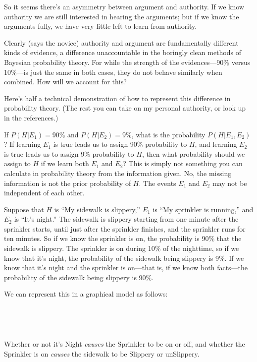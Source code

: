 {
 So it seems there's an asymmetry between argument
and authority. If we know authority we are still interested in hearing
the arguments; but if we know the arguments fully, we have very little
left to learn from authority.}

{
 Clearly (says the novice) authority and argument are fundamentally
different kinds of evidence, a difference unaccountable in the boringly
clean methods of Bayesian probability theory. For while the strength of
the evidences---90\% versus 10\%---is just the same in both cases, they
do not behave similarly when combined. How will we account for this?}

{
 Here's half a technical demonstration of how to
represent this difference in probability theory. (The rest you can take
on my personal authority, or look up in the references.)}

{
 If $P(H|E_{1}) = 90\%$ and
$P(H|E_{2}) = 9\%$, what is the probability
$P(H|E_{1},E_{2})$? If learning
$E_{1}$ is true leads us to assign 90\% probability to $H$,
and learning $E_{2}$ is true leads us to assign 9\%
probability to $H$, then what probability should we assign to $H$ if we
learn both $E_{1}$ and $E_{2}$? This is simply
not something you can calculate in probability theory from the
information given. No, the missing information is not the prior
probability of $H$. The events $E_{1}$ and $E_{2}$
may not be independent of each other.}

{
 Suppose that $H$ is ``My sidewalk is
slippery,'' $E_{1}$ is
``My sprinkler is running,'' and
$E_{2}$ is ``It's
night.'' The sidewalk is slippery starting from one
minute after the sprinkler starts, until just after the sprinkler
finishes, and the sprinkler runs for ten minutes. So if we know the
sprinkler is on, the probability is 90\% that the sidewalk is slippery.
The sprinkler is on during 10\% of the nighttime, so if we know that
it's night, the probability of the sidewalk being
slippery is 9\%. If we know that it's night and the
sprinkler is on---that is, if we know both facts---the probability of
the sidewalk being slippery is 90\%.}

{
 We can represent this in a graphical model as follows:}

{
 ~}



{
 ~}

{
 Whether or not it's Night \textit{causes} the
Sprinkler to be on or off, and whether the Sprinkler is on
\textit{causes} the sidewalk to be Slippery or unSlippery.}

